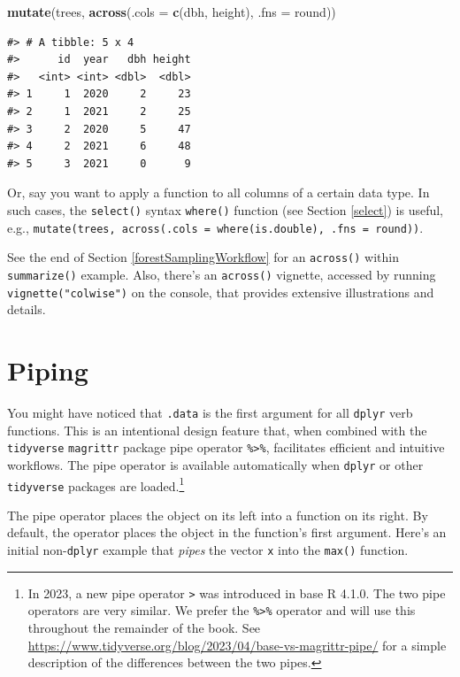 \documentclass[
  11pt,
]{krantz}
\newenvironment{Shaded}{\begin{snugshade}}{\end{snugshade}}
\newcommand{\DataTypeTok}[1]{\textcolor[rgb]{0.13,0.29,0.53}{#1}}
\newcommand{\KeywordTok}[1]{\textcolor[rgb]{0.13,0.29,0.53}{\textbf{#1}}}
\newcommand{\NormalTok}[1]{#1}
\theoremstyle{definition}
\theoremstyle{definition}
\theoremstyle{definition}
\theoremstyle{definition}
\theoremstyle{remark}
\begin{document}
\begin{Shaded}
\begin{Highlighting}[]
\KeywordTok{mutate}\NormalTok{(trees, }\KeywordTok{across}\NormalTok{(}\DataTypeTok{.cols =} \KeywordTok{c}\NormalTok{(dbh, height), }\DataTypeTok{.fns =}\NormalTok{ round))}
\end{Highlighting}
\end{Shaded}

\begin{verbatim}
#> # A tibble: 5 x 4
#>      id  year   dbh height
#>   <int> <int> <dbl>  <dbl>
#> 1     1  2020     2     23
#> 2     1  2021     2     25
#> 3     2  2020     5     47
#> 4     2  2021     6     48
#> 5     3  2021     0      9
\end{verbatim}

Or, say you want to apply a function to all columns of a certain data type. In such cases, the \texttt{select()} syntax \texttt{where()} function (see Section \ref{select}) is useful, e.g., \texttt{mutate(trees,\ across(.cols\ =\ where(is.double),\ .fns\ =\ round))}.

See the end of Section \ref{forestSamplingWorkflow} for an \texttt{across()} within \texttt{summarize()} example. Also, there's an \texttt{across()} vignette, accessed by running \texttt{vignette("colwise")} on the console, that provides extensive illustrations and details.

\hypertarget{pipes}{%
\section{Piping}\label{pipes}}

You might have noticed that \texttt{.data} is the first argument for all \texttt{dplyr} verb functions. This is an intentional design feature that, when combined with the \texttt{tidyverse} \texttt{magrittr} package pipe operator \texttt{\%\textgreater{}\%}, facilitates efficient and intuitive workflows. The pipe operator is available automatically when \texttt{dplyr} or other \texttt{tidyverse} packages are loaded.\footnote{In 2023, a new pipe operator \texttt{\textbar{}\textgreater{}} was introduced in base R 4.1.0. The two pipe operators are very similar. We prefer the \texttt{\%\textgreater{}\%} operator and will use this throughout the remainder of the book. See \url{https://www.tidyverse.org/blog/2023/04/base-vs-magrittr-pipe/} for a simple description of the differences between the two pipes.}

The pipe operator places the object on its left into a function on its right. By default, the operator places the object in the function's first argument. Here's an initial non-\texttt{dplyr} example that \emph{pipes} the vector \texttt{x} into the \texttt{max()} function.
\end{document}
